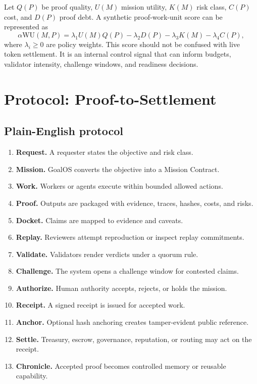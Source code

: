 Let $Q(P)$ be proof quality, $U(M)$ mission utility, $K(M)$ risk class, $C(P)$ cost, and $D(P)$ proof debt. A synthetic proof-work-unit score can be represented as
\[
  \alpha\mathrm{WU}(M,P)=\lambda_1 U(M)Q(P)-\lambda_2 D(P)-\lambda_3 K(M)-\lambda_4 C(P),
\]
where $\lambda_i\geq0$ are policy weights. This score should not be confused with live token settlement. It is an internal control signal that can inform budgets, validator intensity, challenge windows, and readiness decisions.

\section{Protocol: Proof-to-Settlement}

\subsection{Plain-English protocol}

\begin{enumerate}
  \item \textbf{Request.} A requester states the objective and risk class.
  \item \textbf{Mission.} GoalOS converts the objective into a Mission Contract.
  \item \textbf{Work.} Workers or agents execute within bounded allowed actions.
  \item \textbf{Proof.} Outputs are packaged with evidence, traces, hashes, costs, and risks.
  \item \textbf{Docket.} Claims are mapped to evidence and caveats.
  \item \textbf{Replay.} Reviewers attempt reproduction or inspect replay commitments.
  \item \textbf{Validate.} Validators render verdicts under a quorum rule.
  \item \textbf{Challenge.} The system opens a challenge window for contested claims.
  \item \textbf{Authorize.} Human authority accepts, rejects, or holds the mission.
  \item \textbf{Receipt.} A signed receipt is issued for accepted work.
  \item \textbf{Anchor.} Optional hash anchoring creates tamper-evident public reference.
  \item \textbf{Settle.} Treasury, escrow, governance, reputation, or routing may act on the receipt.
  \item \textbf{Chronicle.} Accepted proof becomes controlled memory or reusable capability.
\end{enumerate}

